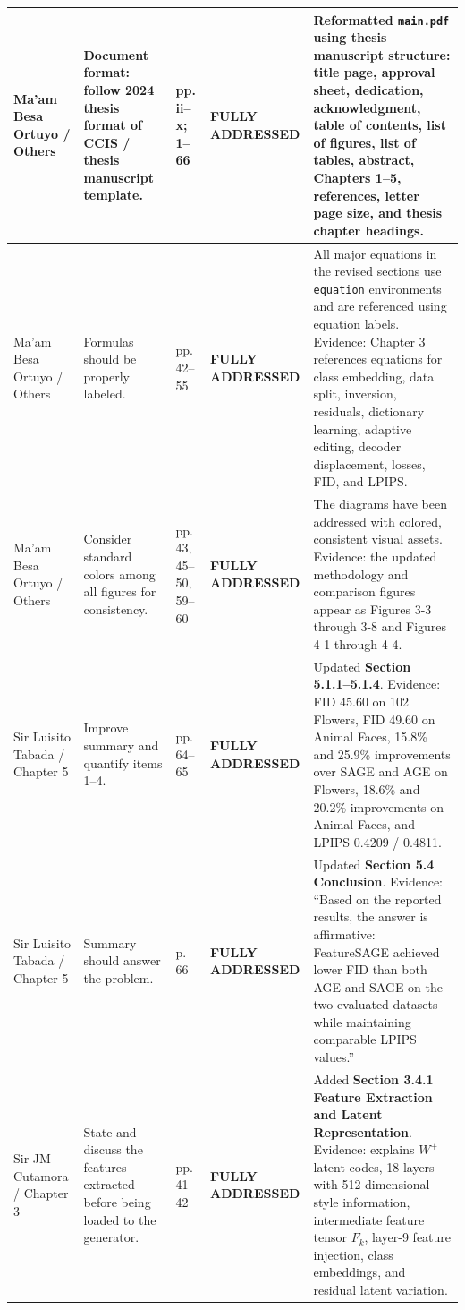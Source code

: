 \documentclass[11pt]{article}
\newcommand{\full}{\textbf{\textcolor{green!45!black}{FULLY ADDRESSED}}}
\begin{document}
\begin{longtable}{|p{}|p{}|p{}|p{}|p{}|}
Ma'am Besa Ortuyo / Others
& Document format: follow 2024 thesis format of CCIS / thesis manuscript template.
& pp. ii--x; 1--66
& \full
& Reformatted \texttt{main.pdf} using thesis manuscript structure: title page, approval sheet, dedication, acknowledgment, table of contents, list of figures, list of tables, abstract, Chapters 1--5, references, letter page size, and thesis chapter headings.\\
\hline

Ma'am Besa Ortuyo / Others
& Formulas should be properly labeled.
& pp. 42--55
& \full
& All major equations in the revised sections use \texttt{equation} environments and are referenced using equation labels. Evidence: Chapter 3 references equations for class embedding, data split, inversion, residuals, dictionary learning, adaptive editing, decoder displacement, losses, FID, and LPIPS.\\
\hline

Ma'am Besa Ortuyo / Others
& Consider standard colors among all figures for consistency.
& pp. 43, 45--50, 59--60
& \full
& The diagrams have been addressed with colored, consistent visual assets. Evidence: the updated methodology and comparison figures appear as Figures 3-3 through 3-8 and Figures 4-1 through 4-4.\\
\hline

Sir Luisito Tabada / Chapter 5
& Improve summary and quantify items 1--4.
& pp. 64--65
& \full
& Updated \textbf{Section 5.1.1--5.1.4}. Evidence: FID 45.60 on 102 Flowers, FID 49.60 on Animal Faces, 15.8\% and 25.9\% improvements over SAGE and AGE on Flowers, 18.6\% and 20.2\% improvements on Animal Faces, and LPIPS 0.4209 / 0.4811.\\
\hline

Sir Luisito Tabada / Chapter 5
& Summary should answer the problem.
& p. 66
& \full
& Updated \textbf{Section 5.4 Conclusion}. Evidence: ``Based on the reported results, the answer is affirmative: FeatureSAGE achieved lower FID than both AGE and SAGE on the two evaluated datasets while maintaining comparable LPIPS values.''\\
\hline

Sir JM Cutamora / Chapter 3
& State and discuss the features extracted before being loaded to the generator.
& pp. 41--42
& \full
& Added \textbf{Section 3.4.1 Feature Extraction and Latent Representation}. Evidence: explains $W^{+}$ latent codes, 18 layers with 512-dimensional style information, intermediate feature tensor $F_k$, layer-9 feature injection, class embeddings, and residual latent variation.\\
\hline


\end{longtable}
\end{document}
